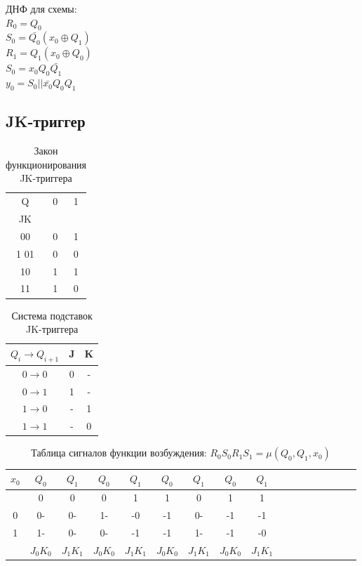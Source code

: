 \documentclass[a4paper,10pt]{article}
\begin{document}
		ДНФ для схемы: \\
		$R_0 = Q_0$ \\
		$S_0 = \bar{Q_0} (x_0 \oplus Q_1)$ \\
		$R_1 = Q_1 (x_0 \oplus Q_0)$ \\
		$S_0 = x_0 Q_0 \bar{Q_1}$ \\
		$y_0 = S_0 || \bar{x_0} Q_0 Q_1 $

	\subsection*{JK-триггер}
    		\begin{table}[h!]
				\center
    			\begin{tabular}{|c|c|c|}
					\hline
					 Q  & 0 & 1 \\
					 JK &   &   \\ \hline
					 00 & 0 & 1 \\ \hline1
					 01 & 0 & 0 \\ \hline
					 10 & 1 & 1 \\ \hline
					 11 & 1 & 0 \\ \hline
				\end{tabular}
    			\caption{Закон функционирования JK-триггера}
    		\end{table}
    		\begin{table}[h!]
				\center
    			\begin{tabular}{|c|c|c|}
					\hline
            $Q_i \to Q_{i+1}$  & J & K \\ \hline
					 $0 \to 0$ & 0 & - \\ \hline
					 $0 \to 1$ & 1 & - \\ \hline
					 $1 \to 0$ & - & 1 \\ \hline
					 $1 \to 1$ & - & 0 \\ \hline
				\end{tabular}
    			\caption{Система подставок JK-триггера}
    		\end{table}
    		\begin{table}[h!]
				\center
        		\begin{tabular}{|c||c|c||c|c||c|c||c|c||c|c||c|c||c|c||c|c|}
				 \hline
			     $x_0$ &  $Q_0$ & $Q_1$  &  $Q_0$ & $Q_1$  &  $Q_0$ & $Q_1$  &  $Q_0$ & $Q_1$ \\ \hline
					   &    0   &   0    &    0   &   1    &    1   &   0    &    1   &   1   \\ \hline
					0  &   0-   &  0-    &   1-   &  -0    &   -1   &  0-    &   -1   &  -1   \\ \hline
					1  &   1-   &  0-    &   0-   &  -1    &   -1   &  1-    &   -1   &  -0   \\ \hline
					   &$J_0K_0$&$J_1K_1$&$J_0K_0$&$J_1K_1$&$J_0K_0$&$J_1K_1$&$J_0K_0$&$J_1K_1$ \\ \hline
        		\end{tabular}
    			\caption{Таблица сигналов функции возбуждения: $R_0S_0R_1S_1 = \mu(Q_0,Q_1,x_0)$}
    		\end{table}
\end{document}
